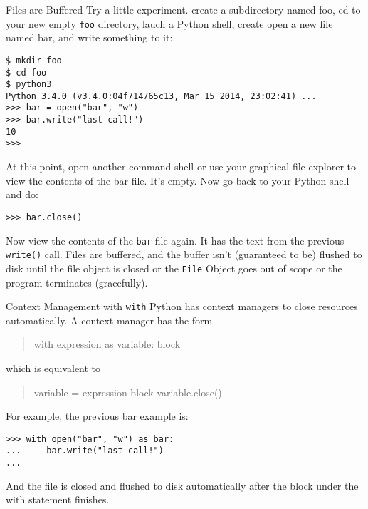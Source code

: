 \documentclass[smaller, aspectratio=1610]{beamer}
\begin{document}
\begin{frame}[label={sec:orga6287c3},fragile]{Files are Buffered}
 Try a little experiment. create a subdirectory named foo, cd to your new empty \texttt{foo} directory, lauch a Python shell, create open a new file named bar, and write something to it:

\lstset{language=Python,label= ,caption= ,captionpos=b,numbers=none}
\begin{lstlisting}
$ mkdir foo
$ cd foo
$ python3
Python 3.4.0 (v3.4.0:04f714765c13, Mar 15 2014, 23:02:41) ...
>>> bar = open("bar", "w")
>>> bar.write("last call!")
10
>>>
\end{lstlisting}

At this point, open another command shell or use your graphical file
explorer to view the contents of the bar file. It’s empty. Now go back to
your Python shell and do:

\lstset{language=Python,label= ,caption= ,captionpos=b,numbers=none}
\begin{lstlisting}
>>> bar.close()
\end{lstlisting}

Now view the contents of the \texttt{bar} file again. It has the text from the previous \texttt{write()} call. Files are buffered, and the buffer isn’t (guaranteed to be) flushed to disk until the file object is closed or the \texttt{File} Object goes out of scope or the program terminates (gracefully).
\end{frame}

\begin{frame}[label={sec:orgfaebd0f},fragile]{Context Management with \texttt{with}}
 Python has context managers to close resources automatically. A context manager has the form

\begin{quote}
\begin{VERBATIM}
with expression as variable:
    block
\end{VERBATIM}
\end{quote}

which is equivalent to

\begin{quote}
\begin{VERBATIM}
variable = expression
block
variable.close()
\end{VERBATIM}
\end{quote}

For example, the previous bar example is:

\lstset{language=Python,label= ,caption= ,captionpos=b,numbers=none}
\begin{lstlisting}
>>> with open("bar", "w") as bar:
...     bar.write("last call!")
...
\end{lstlisting}

And the file is closed and flushed to disk automatically after the block under the with statement finishes.
\end{frame}
\end{document}
